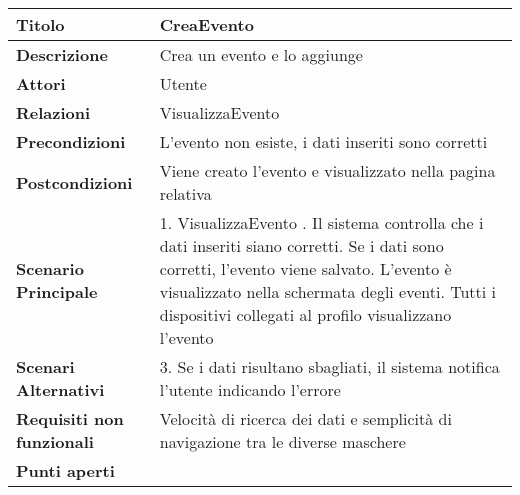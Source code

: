 \begin{tabular} {|P{4.5cm}|P{12.5cm}|}
  \hline
  \textbf{Titolo}                   & CreaEvento                                                                        \\
  \hline
  \textbf{Descrizione}              & Crea un evento e lo aggiunge                                                      \\
  \hline
  \textbf{Attori}                   & Utente                                                                            \\
  \hline
  \textbf{Relazioni}                & VisualizzaEvento                                                                  \\
  \hline
  \textbf{Precondizioni}            & L'evento non esiste, i dati inseriti sono corretti                                \\
  \hline
  \textbf{Postcondizioni}           & Viene creato l'evento e visualizzato nella pagina relativa                        \\
  \hline
  \textbf{Scenario Principale}      & 1. VisualizzaEvento . Il sistema controlla che i dati inseriti siano corretti. Se i dati sono corretti, l'evento viene salvato. L'evento è visualizzato nella schermata degli eventi. Tutti i dispositivi collegati al profilo visualizzano l'evento                                                     \\
  \textbf{Scenari Alternativi}      & 3. Se i dati risultano sbagliati, il sistema notifica l'utente indicando l'errore \\
  \hline
  \textbf{Requisiti non funzionali} & Velocità di ricerca dei dati e semplicità di navigazione tra le diverse maschere  \\
  \hline
  \textbf{Punti aperti}             &                                                                                   \\
  \hline
\end{tabular}
\hfill
\break

